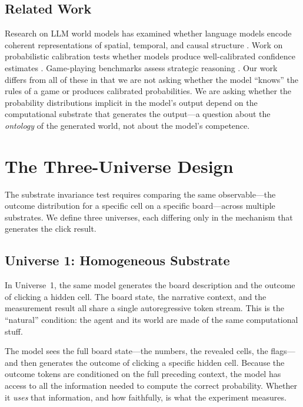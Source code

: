 \documentclass[12pt,a4paper]{article}
\begin{document}
\subsection{Related Work}
\label{sec:related}

Research on LLM world models has examined whether language models encode coherent representations of spatial, temporal, and causal structure \citep{li2023emergent,gurnee2024}. Work on probabilistic calibration tests whether models produce well-calibrated confidence estimates \citep{kadavath2022}. Game-playing benchmarks assess strategic reasoning \citep{tian2024}. Our work differs from all of these in that we are not asking whether the model ``knows'' the rules of a game or produces calibrated probabilities. We are asking whether the probability distributions implicit in the model's output depend on the computational substrate that generates the output---a question about the \emph{ontology} of the generated world, not about the model's competence.

\section{The Three-Universe Design}
\label{sec:three_universes}

The substrate invariance test requires comparing the same observable---the outcome distribution for a specific cell on a specific board---across multiple substrates. We define three universes, each differing only in the mechanism that generates the click result.

\subsection{Universe 1: Homogeneous Substrate}
\label{sec:universe1}

In Universe~1, the same model generates the board description and the outcome of clicking a hidden cell. The board state, the narrative context, and the measurement result all share a single autoregressive token stream. This is the ``natural'' condition: the agent and its world are made of the same computational stuff.

The model sees the full board state---the numbers, the revealed cells, the flags---and then generates the outcome of clicking a specific hidden cell. Because the outcome tokens are conditioned on the full preceding context, the model has access to all the information needed to compute the correct probability. Whether it \emph{uses} that information, and how faithfully, is what the experiment measures.
\end{document}
